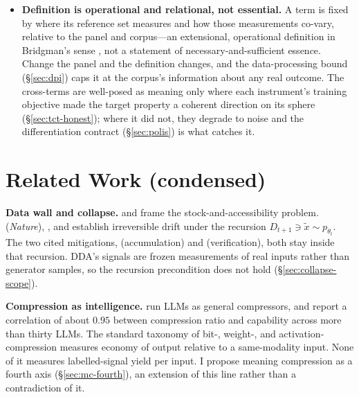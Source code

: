 \documentclass[10pt,twocolumn]{article}
\begin{document}
\begin{itemize}
target $Y$, the corpus must contain observations of $Y$ and the labels must come
from $Y$. The instrument interpolates \emph{within} the distribution its corpus
represents; it cannot extrapolate to a phenomenon with zero representation in the
training data. An axis the corpus never saw is an axis the panel cannot report,
however many cross-terms are formed. This is the boundary that keeps the calculus
empirical: it describes the associational structure of assembled corpora, and
claims nothing about phenomena outside them.
\item \textbf{Definition is operational and relational, not essential.} A term is
fixed by where its reference set measures and how those measurements co-vary,
relative to the panel and corpus---an extensional, operational definition in
Bridgman's sense \citep{bridgman1927logic}, not a statement of
necessary-and-sufficient essence. Change the panel and the definition changes,
and the data-processing bound (\S\ref{sec:dpi}) caps it at the corpus's
information about any real outcome. The cross-terms are well-posed as meaning only
where each instrument's training objective made the target property a coherent
direction on its sphere (\S\ref{sec:tct-honest}); where it did not, they degrade
to noise and the differentiation contract (\S\ref{sec:polis}) is what catches it.
\end{itemize}

\section{Related Work (condensed)}
\label{sec:related}
\textbf{Data wall and collapse.} \citet{villalobos2022data} and
\citet{longpre2024consent} frame the stock-and-accessibility problem.
\citet{shumailov2024collapse} (\emph{Nature}), \citet{dohmatob2024tale}, and
\citet{alemohammad2023mad} establish irreversible drift under the recursion
$D_{t+1}\ni\tilde x\sim p_{\theta_t}$. The two cited mitigations,
\citet{gerstgrasser2024inevitable} (accumulation) and \citet{feng2024beyond}
(verification), both stay inside that recursion. DDA's signals are frozen
measurements of real inputs rather than generator samples, so the recursion
precondition does not hold (\S\ref{sec:collapse-scope}).

\textbf{Compression as intelligence.} \citet{deletang2024compression} run LLMs as
general compressors, and \citet{huang2024compression} report a correlation of
about $0.95$ between compression ratio and capability across more than thirty
LLMs. The standard taxonomy of bit-, weight-, and activation-compression measures
economy of output relative to a same-modality input. None of it measures
labelled-signal yield per input. I propose meaning compression as a fourth axis
(\S\ref{sec:mc-fourth}), an extension of this line rather than a contradiction of
it.
\end{document}
